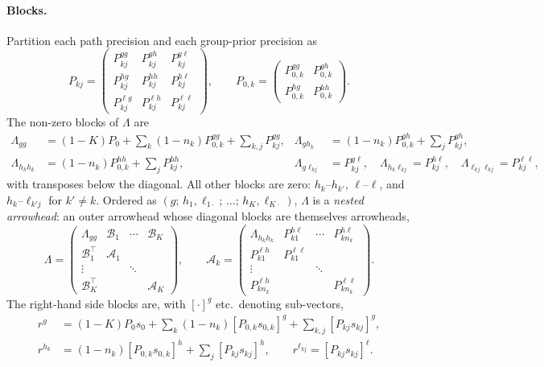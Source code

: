 \documentclass[11pt]{article}
\theoremstyle{definition}
\theoremstyle{remark}
\newcommand{\T}{\top}
\newcommand{\hk}{h_k}
\newcommand{\lkj}{\ell_{kj}}
\begin{document}
\paragraph{Blocks.} Partition each path precision and each group-prior precision as
\[
P_{kj}=\begin{pmatrix}P^{gg}_{kj}&P^{gh}_{kj}&P^{g\ell}_{kj}\\P^{hg}_{kj}&P^{hh}_{kj}&P^{h\ell}_{kj}\\P^{\ell g}_{kj}&P^{\ell h}_{kj}&P^{\ell\ell}_{kj}\end{pmatrix},\qquad
P_{0,k}=\begin{pmatrix}P^{gg}_{0,k}&P^{gh}_{0,k}\\P^{hg}_{0,k}&P^{hh}_{0,k}\end{pmatrix}.
\]
The non-zero blocks of $\Lambda$ are
\begin{equation}\label{eq:Lambda-blocks}
\begin{aligned}
\Lambda_{gg}&=(1-K)P_0+\sum_k(1-n_k)P^{gg}_{0,k}+\sum_{k,j}P^{gg}_{kj},&
\Lambda_{g\hk}&=(1-n_k)P^{gh}_{0,k}+\sum_jP^{gh}_{kj},\\
\Lambda_{\hk\hk}&=(1-n_k)P^{hh}_{0,k}+\sum_jP^{hh}_{kj},&
\Lambda_{g\lkj}&=P^{g\ell}_{kj},\quad
\Lambda_{\hk\lkj}=P^{h\ell}_{kj},\quad
\Lambda_{\lkj\lkj}=P^{\ell\ell}_{kj},
\end{aligned}
\end{equation}
with transposes below the diagonal. All other blocks are zero: $h_k$--$h_{k'}$,
$\ell$--$\ell$, and $h_k$--$\ell_{k'j}$ for $k'\neq k$. Ordered as
$(g;\,h_1,\ell_{1\cdot};\,\dots;\,h_K,\ell_{K\cdot})$, $\Lambda$ is a \emph{nested
arrowhead}: an outer arrowhead whose diagonal blocks are themselves arrowheads,
\[
\Lambda=\begin{pmatrix}
\Lambda_{gg}&\mathcal{B}_1&\cdots&\mathcal{B}_K\\
\mathcal{B}_1^\T&\mathcal{A}_1&&\\
\vdots&&\ddots&\\
\mathcal{B}_K^\T&&&\mathcal{A}_K
\end{pmatrix},\qquad
\mathcal{A}_k=\begin{pmatrix}
\Lambda_{\hk\hk}&P^{h\ell}_{k1}&\cdots&P^{h\ell}_{kn_k}\\
P^{\ell h}_{k1}&P^{\ell\ell}_{k1}&&\\
\vdots&&\ddots&\\
P^{\ell h}_{kn_k}&&&P^{\ell\ell}_{kn_k}
\end{pmatrix}.
\]
The right-hand side blocks are, with $[\cdot]^g$ etc.\ denoting sub-vectors,
\begin{equation}\label{eq:r-blocks}
\begin{aligned}
r^g&=(1-K)P_0s_0+\sum_k(1-n_k)[P_{0,k}s_{0,k}]^g+\sum_{k,j}[P_{kj}s_{kj}]^g,\\
r^{\hk}&=(1-n_k)[P_{0,k}s_{0,k}]^h+\sum_j[P_{kj}s_{kj}]^h,\qquad
r^{\lkj}=[P_{kj}s_{kj}]^\ell.
\end{aligned}
\end{equation}
\end{document}
